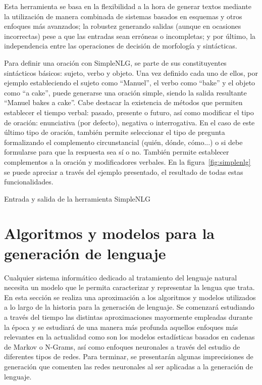 Esta herramienta se basa en la flexibilidad a la hora de generar textos mediante la utilización de manera combinada de sistemas basados en esquemas y otros enfoques más avanzados; la robustez generando salidas (aunque en ocasiones incorrectas) pese a que las entradas sean erróneas o incompletas; y por último, la independencia entre las operaciones de decisión de morfología y sintácticas.

Para definir una oración con SimpleNLG, se parte de sus constituyentes sintácticos básicos: sujeto, verbo y objeto. Una vez definido cada uno de ellos, por ejemplo estableciendo el sujeto como ``Manuel'', el verbo como ``bake'' y el objeto como ``a cake'', puede generarse una oración simple, siendo la salida resultante ``Manuel bakes a cake''. Cabe destacar la existencia de métodos que permiten establecer el tiempo verbal: pasado, presente o futuro, así como modificar el tipo de oración: enunciativa (por defecto), negativa o interrogativa. En el caso de este último tipo de oración, también permite seleccionar el tipo de pregunta formalizando el complemento circunstancial (quién, dónde, cómo...) o si debe formularse para que la respuesta sea sí o no. También permite establecer complementos a la oración y modificadores verbales. En la figura~\ref{fig:simplenlg} se puede apreciar a través del ejemplo presentado, el resultado de todas estas funcionalidades.


%
{Entrada y salida de la herramienta SimpleNLG}

\section{Algoritmos y modelos para la generación de lenguaje}
\label{sec:modelos}
Cualquier sistema informático dedicado al tratamiento del lenguaje natural necesita un modelo que le permita caracterizar y representar la lengua que trata. En esta sección se realiza una aproximación a los algoritmos y modelos utilizados a lo largo de la historia para la generación de lenguaje. Se comenzará estudiando a través del tiempo las distintas aproximaciones mayormente empleadas durante la época y se estudiará de una manera más profunda aquellos enfoques más relevantes en la actualidad como son los modelos estadísticas basados en cadenas de Markov o N-Grams, así como enfoques neuronales a través del estudio de diferentes tipos de redes. Para terminar, se presentarán algunas imprecisiones de generación que comenten las redes neuronales al ser aplicadas a la generación de lenguaje.


